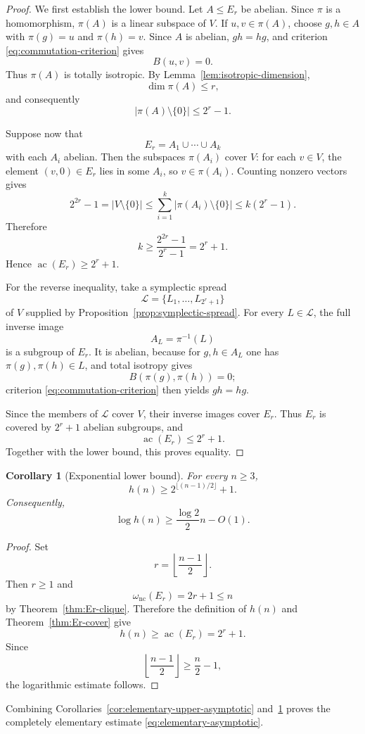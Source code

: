 \documentclass[11pt]{article}
\newtheorem{corollary}[theorem]{Corollary}
\theoremstyle{definition}
\newcommand{\nc}{\omega_{\mathrm{nc}}}
\newcommand{\ac}{\operatorname{ac}}
\begin{document}
\begin{proof}
We first establish the lower bound.  Let $A\le E_r$ be abelian.  Since $\pi$ is a homomorphism, $\pi(A)$ is a linear subspace of $V$.  If $u,v\in\pi(A)$, choose $g,h\in A$ with $\pi(g)=u$ and $\pi(h)=v$.  Since $A$ is abelian, $gh=hg$, and criterion \eqref{eq:commutation-criterion} gives
\[
 B(u,v)=0.
\]
Thus $\pi(A)$ is totally isotropic.  By Lemma~\ref{lem:isotropic-dimension},
\[
 \dim\pi(A)\le r,
\]
and consequently
\[
 |\pi(A)\setminus\{0\}|\le2^r-1.
\]

Suppose now that
\[
 E_r=A_1\cup\cdots\cup A_k
\]
with each $A_i$ abelian.  Then the subspaces $\pi(A_i)$ cover $V$: for each $v\in V$, the element $(v,0)\in E_r$ lies in some $A_i$, so $v\in\pi(A_i)$.  Counting nonzero vectors gives
\[
 2^{2r}-1
 =|V\setminus\{0\}|
 \le\sum_{i=1}^k|\pi(A_i)\setminus\{0\}|
 \le k(2^r-1).
\]
Therefore
\[
 k\ge\frac{2^{2r}-1}{2^r-1}=2^r+1.
\]
Hence $\ac(E_r)\ge2^r+1$.

For the reverse inequality, take a symplectic spread
\[
 \mathcal{L}=\{L_1,\dots,L_{2^r+1}\}
\]
of $V$ supplied by Proposition~\ref{prop:symplectic-spread}.  For every $L\in\mathcal{L}$, the full inverse image
\[
 A_L=\pi^{-1}(L)
\]
is a subgroup of $E_r$.  It is abelian, because for $g,h\in A_L$ one has $\pi(g),\pi(h)\in L$, and total isotropy gives
\[
 B(\pi(g),\pi(h))=0;
\]
criterion \eqref{eq:commutation-criterion} then yields $gh=hg$.

Since the members of $\mathcal{L}$ cover $V$, their inverse images cover $E_r$.  Thus $E_r$ is covered by $2^r+1$ abelian subgroups, and
\[
 \ac(E_r)\le2^r+1.
\]
Together with the lower bound, this proves equality.
\end{proof}

\begin{corollary}[Exponential lower bound]\label{cor:exponential-lower}
For every $n\ge3$,
\[
 h(n)\ge2^{\lfloor(n-1)/2\rfloor}+1.
\]
Consequently,
\[
 \log h(n)\ge\frac{\log2}{2}n-O(1).
\]
\end{corollary}

\begin{proof}
Set
\[
 r=\left\lfloor\frac{n-1}{2}\right\rfloor.
\]
Then $r\ge1$ and
\[
 \nc(E_r)=2r+1\le n
\]
by Theorem~\ref{thm:Er-clique}.  Therefore the definition of $h(n)$ and Theorem~\ref{thm:Er-cover} give
\[
 h(n)\ge\ac(E_r)=2^r+1.
\]
Since
\[
 \left\lfloor\frac{n-1}{2}\right\rfloor\ge\frac n2-1,
\]
the logarithmic estimate follows.
\end{proof}

Combining Corollaries~\ref{cor:elementary-upper-asymptotic} and~\ref{cor:exponential-lower} proves the completely elementary estimate \eqref{eq:elementary-asymptotic}.
\end{document}
